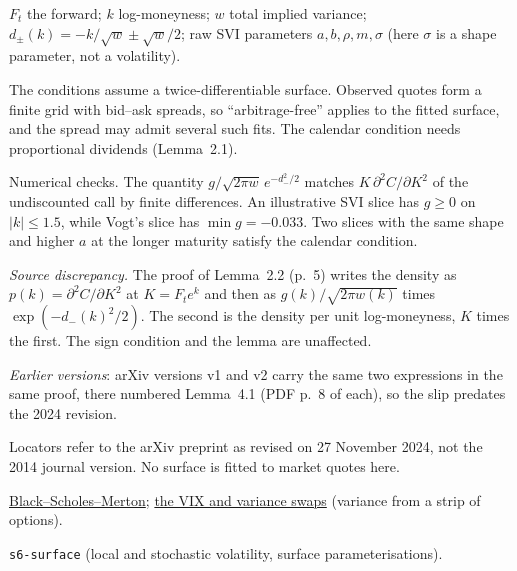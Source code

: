 \begin{qfdefinition}
 $F_t$ the forward; $k$ log-moneyness; $w$ total implied variance; $d_\pm(k)=-k/\sqrt{w}\pm\sqrt w/2$; raw SVI parameters $a,b,\rho,m,\sigma$ (here $\sigma$ is a shape parameter, not a volatility).

 The conditions assume a twice-differentiable surface. Observed quotes form a finite grid with bid--ask spreads, so ``arbitrage-free'' applies to the fitted surface, and the spread may admit several such fits. The calendar condition needs proportional dividends (Lemma~2.1).

 Numerical checks. The quantity $g/\sqrt{2\pi w}\,e^{-d_-^2/2}$ matches $K\,\partial^2C/\partial K^2$ of the undiscounted call by finite differences. An illustrative SVI slice has $g\ge0$ on $|k|\le1.5$, while Vogt's slice has $\min g=-0.033$. Two slices with the same shape and higher $a$ at the longer maturity satisfy the calendar condition.

\emph{Source discrepancy.} The proof of Lemma~2.2 (p.~5) writes the density as $p(k)=\partial^2C/\partial K^2$ at $K=F_te^k$ and then as $g(k)/\sqrt{2\pi w(k)}$ times $\exp(-d_-(k)^2/2)$. The second is the density per unit log-moneyness, $K$ times the first. The sign condition and the lemma are unaffected.

\emph{Earlier versions}: arXiv versions v1 and v2 carry the same two expressions in the same proof, there numbered Lemma~4.1 (PDF p.~8 of each), so the slip predates the 2024 revision.

 Locators refer to the arXiv preprint as revised on 27 November 2024, not the 2014 journal version. No surface is fitted to market quotes here.

 \hyperref[mod:black-scholes-merton]{Black--Scholes--Merton}; \hyperref[def:vix-variance-dividend-swaps]{the VIX and variance swaps} (variance from a strip of options).

 \nolinkurl{s6-surface} (local and stochastic volatility, surface parameterisations).

\end{qfdefinition}

